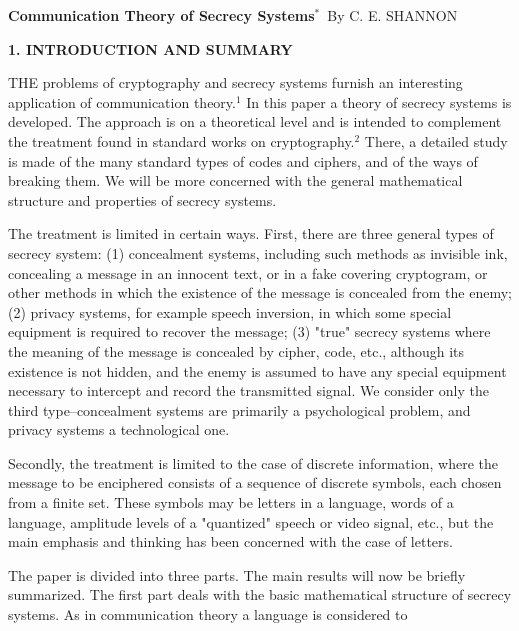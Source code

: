 \documentclass{article}
\begin{document}

\vspace{184.14mm}

\begin{center}
\textbf{Communication Theory of Secrecy Systems$^*$}\
By C. E. SHANNON
\end{center}

\begin{center}
\textbf{1. INTRODUCTION AND SUMMARY}
\end{center}

THE problems of cryptography and secrecy systems furnish an interesting application of communication theory.$^1$ In this paper a theory of secrecy systems is developed. The approach is on a theoretical level and is intended to complement the treatment found in standard works on cryptography.$^2$ There, a detailed study is made of the many standard types of codes and ciphers, and of the ways of breaking them. We will be more concerned with the general mathematical structure and properties of secrecy systems.

The treatment is limited in certain ways. First, there are three general types of secrecy system: (1) concealment systems, including such methods as invisible ink, concealing a message in an innocent text, or in a fake covering cryptogram, or other methods in which the existence of the message is concealed from the enemy; (2) privacy systems, for example speech inversion, in which some special equipment is required to recover the message; (3) "true" secrecy systems where the meaning of the message is concealed by cipher, code, etc., although its existence is not hidden, and the enemy is assumed to have any special equipment necessary to intercept and record the transmitted signal. We consider only the third type--concealment systems are primarily a psychological problem, and privacy systems a technological one.

Secondly, the treatment is limited to the case of discrete information, where the message to be enciphered consists of a sequence of discrete symbols, each chosen from a finite set. These symbols may be letters in a language, words of a language, amplitude levels of a "quantized" speech or video signal, etc., but the main emphasis and thinking has been concerned with the case of letters.

The paper is divided into three parts. The main results will now be briefly summarized. The first part deals with the basic mathematical structure of secrecy systems. As in communication theory a language is considered to
\end{document}
